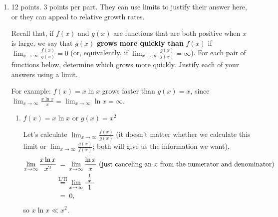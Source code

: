 \documentclass{article}
\begin{document}
\begin{enumerate}

\item 

\begin{grading}
12 points. 3 points per part. They can use limits to justify their answer here, or they can appeal to relative growth rates.
\end{grading}


  Recall that, if $f(x)$ and $g(x)$ are functions that are both positive
  when $x$ is large, we say that $g(x)$ \textbf{grows more quickly than}
  $f(x)$ if $\displaystyle \lim_{x \to \infty} \frac{f(x)}{g(x)} = 0$ (or,
  equivalently, if $\displaystyle \lim_{x \to \infty} \frac{g(x)}{f(x)} =
  {\infty}$).
  For each pair of functions below, determine which grows more quickly.
  Justify each of your answers using a limit.

  For example: $f(x)=x\ln x$ grows faster than $g(x) = x$, since
  $\displaystyle \lim_{x\to\infty} \frac{x\ln x}{x} = \displaystyle
  \lim_{x\to\infty} \ln x = \infty$.

  \begin{enumerate}
  \item
\begin{problem}[\vfill]
      $\displaystyle f(x) = x\ln x$ or $\displaystyle g(x) = x^2$
    \end{problem}

    \begin{solution}
      Let's calculate $\displaystyle \lim_{x \to \infty}
      \frac{f(x)}{g(x)}$ (it doesn't matter whether we calculate this
      limit or $\displaystyle \lim_{x \to \infty} \frac{g(x)}{f(x)}$; both
      will give us the information we want).  
      \begin{align*}
        \lim_{x \to \infty} \frac{x \ln x}{x^2} & \nolheq \lim_{x \to
          \infty} \frac{\ln x}{x} \text{ (just canceling an $x$ from the
          numerator and denominator)} \\
        &\lheq \lim_{x \to \infty} \frac{\ \frac{1}{x}\ }{1} \\
        & \nolheq 0,
      \end{align*}
      so $\boxed{x \ln x \ll x^2}$.
    \end{solution}



\end{enumerate}
\end{enumerate}
\end{document}
